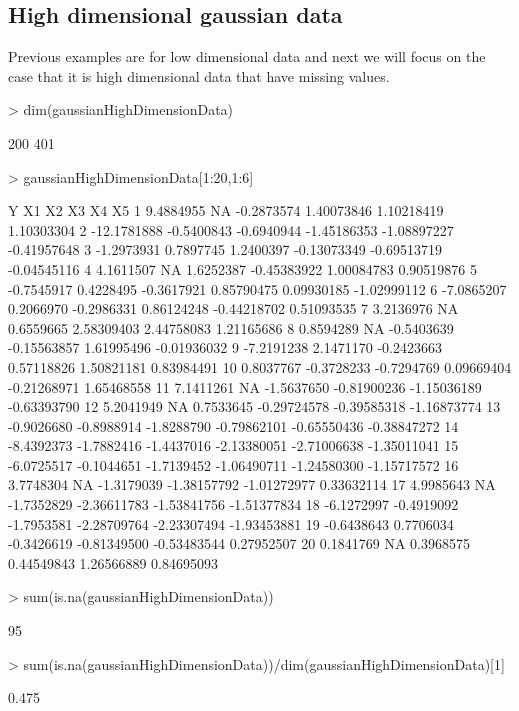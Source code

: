 \documentclass[a4paper]{article}
\begin{document}
\subsection{High dimensional gaussian data}
Previous examples are for low dimensional data and next we will focus on the case that it is high dimensional data that have missing values.
\begin{Schunk}
\begin{Sinput}
> dim(gaussianHighDimensionData)
\end{Sinput}
\begin{Soutput}
[1] 200 401
\end{Soutput}
\begin{Sinput}
> gaussianHighDimensionData[1:20,1:6]
\end{Sinput}
\begin{Soutput}
             Y         X1         X2          X3          X4          X5
1    9.4884955         NA -0.2873574  1.40073846  1.10218419  1.10303304
2  -12.1781888 -0.5400843 -0.6940944 -1.45186353 -1.08897227 -0.41957648
3   -1.2973931  0.7897745  1.2400397 -0.13073349 -0.69513719 -0.04545116
4    4.1611507         NA  1.6252387 -0.45383922  1.00084783  0.90519876
5   -0.7545917  0.4228495 -0.3617921  0.85790475  0.09930185 -1.02999112
6   -7.0865207  0.2066970 -0.2986331  0.86124248 -0.44218702  0.51093535
7    3.2136976         NA  0.6559665  2.58309403  2.44758083  1.21165686
8    0.8594289         NA -0.5403639 -0.15563857  1.61995496 -0.01936032
9   -7.2191238  2.1471170 -0.2423663  0.57118826  1.50821181  0.83984491
10   0.8037767 -0.3728233 -0.7294769  0.09669404 -0.21268971  1.65468558
11   7.1411261         NA -1.5637650 -0.81900236 -1.15036189 -0.63393790
12   5.2041949         NA  0.7533645 -0.29724578 -0.39585318 -1.16873774
13  -0.9026680 -0.8988914 -1.8288790 -0.79862101 -0.65550436 -0.38847272
14  -8.4392373 -1.7882416 -1.4437016 -2.13380051 -2.71006638 -1.35011041
15  -6.0725517 -0.1044651 -1.7139452 -1.06490711 -1.24580300 -1.15717572
16   3.7748304         NA -1.3179039 -1.38157792 -1.01272977  0.33632114
17   4.9985643         NA -1.7352829 -2.36611783 -1.53841756 -1.51377834
18  -6.1272997 -0.4919092 -1.7953581 -2.28709764 -2.23307494 -1.93453881
19  -0.6438643  0.7706034 -0.3426619 -0.81349500 -0.53483544  0.27952507
20   0.1841769         NA  0.3968575  0.44549843  1.26566889  0.84695093
\end{Soutput}
\begin{Sinput}
> sum(is.na(gaussianHighDimensionData))
\end{Sinput}
\begin{Soutput}
[1] 95
\end{Soutput}
\begin{Sinput}
> sum(is.na(gaussianHighDimensionData))/dim(gaussianHighDimensionData)[1]
\end{Sinput}
\begin{Soutput}
[1] 0.475
\end{Soutput}
\end{Schunk}
\end{document}
